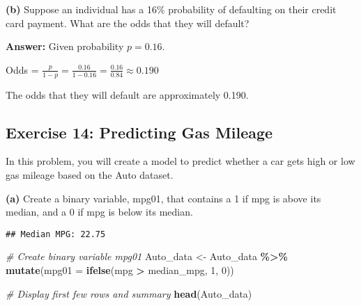 \documentclass[
]{article}
\newenvironment{Shaded}{\begin{snugshade}}{\end{snugshade}}
\newcommand{\AttributeTok}[1]{\textcolor[rgb]{0.13,0.29,0.53}{#1}}
\newcommand{\CommentTok}[1]{\textcolor[rgb]{0.56,0.35,0.01}{\textit{#1}}}
\newcommand{\DecValTok}[1]{\textcolor[rgb]{0.00,0.00,0.81}{#1}}
\newcommand{\FunctionTok}[1]{\textcolor[rgb]{0.13,0.29,0.53}{\textbf{#1}}}
\newcommand{\NormalTok}[1]{#1}
\newcommand{\OtherTok}[1]{\textcolor[rgb]{0.56,0.35,0.01}{#1}}
\newcommand{\SpecialCharTok}[1]{\textcolor[rgb]{0.81,0.36,0.00}{\textbf{#1}}}
\newcommand{\StringTok}[1]{\textcolor[rgb]{0.31,0.60,0.02}{#1}}
\begin{document}
\textbf{(b)} Suppose an individual has a 16\% probability of defaulting
on their credit card payment. What are the odds that they will default?

\textbf{Answer:} Given probability \(p = 0.16\).

Odds =
\(\frac{p}{1-p} = \frac{0.16}{1 - 0.16} = \frac{0.16}{0.84} \approx \mathbf{0.190}\)

The odds that they will default are approximately 0.190.

\subsection{Exercise 14: Predicting Gas
Mileage}\label{exercise-14-predicting-gas-mileage}

In this problem, you will create a model to predict whether a car gets
high or low gas mileage based on the Auto dataset.

\textbf{(a)} Create a binary variable, mpg01, that contains a 1 if mpg
is above its median, and a 0 if mpg is below its median.

\begin{Shaded}
\end{Shaded}

\begin{verbatim}
## Median MPG: 22.75
\end{verbatim}

\begin{Shaded}
\begin{Highlighting}[]
\CommentTok{\# Create binary variable mpg01}
\NormalTok{Auto\_data }\OtherTok{\textless{}{-}}\NormalTok{ Auto\_data }\SpecialCharTok{\%\textgreater{}\%}
  \FunctionTok{mutate}\NormalTok{(}\AttributeTok{mpg01 =} \FunctionTok{ifelse}\NormalTok{(mpg }\SpecialCharTok{\textgreater{}}\NormalTok{ median\_mpg, }\DecValTok{1}\NormalTok{, }\DecValTok{0}\NormalTok{))}

\CommentTok{\# Display first few rows and summary}
\FunctionTok{head}\NormalTok{(Auto\_data)}
\end{Highlighting}
\end{Shaded}
\end{document}
